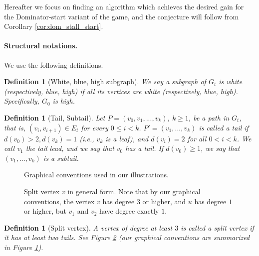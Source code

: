 \documentclass[11pt]{article}
\newtheorem{definition}[theorem]{Definition}
\theoremstyle{definition}
\begin{document}
Hereafter we focus on finding an algorithm which achieves the desired gain for the Dominator-start variant of the game, and the conjecture will follow from Corollary \ref{cor:dom_stall_start}.


\paragraph{Structural notations.}
We use the following definitions.

\begin{definition}[White, blue, high subgraph]
We say a subgraph of $G_t$ is white (respectively, blue, high) if all its vertices are white (respectively, blue, high).
Specifically, $G_0$ is high.
\end{definition}

\begin{definition}[Tail, Subtail] 
Let $P = (v_0, v_1, ..., v_k)$, $k \geq 1$, be a path in $G_t$,
that is, ${(v_i, v_{i+1}) \in E_t}$ for every $0 \leq i <k$.
$P' = (v_1, ..., v_k)$ is called a \emph{tail} if 
	$d(v_0) > 2, d(v_k) = 1$ (i.e., $v_k$ is a leaf), and $d(v_i) = 2$ for all $0<i<k$.
We call $v_1$ the \emph{tail lead}, and we say that $v_0$ has a tail.
If $d(v_0) \geq 1$, we say that $(v_1, ..., v_k)$ is a \emph{subtail}.
\end{definition}

\begin{figure}[thbp]
  \caption{\sf Graphical conventions used in our illustrations.}
  \medskip
  \centering
  \label{fig:notations}
\end{figure}

\begin{figure}[thbp]
  \caption{\sf Split vertex $v$ in general form.
Note that by our graphical conventions, the vertex $v$ has degree $3$ or higher, and $u$ has degree $1$ or higher, but $v_1$ and $v_2$ have degree exactly $1$.}
  \medskip
  \centering
  \label{fig:splitP}
\end{figure}
	
\begin{definition}[Split vertex] 
\label{def:split_vertex}
A vertex of degree at least $3$ is called a \emph{split} vertex if it has at least two tails. See Figure \ref{fig:splitP} (our graphical conventions are summarized in Figure \ref{fig:notations}).
\end{definition}
	
\end{document}
